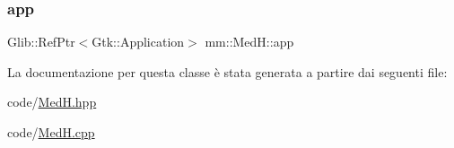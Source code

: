 \subsubsection{\texorpdfstring{app}{app}}
{\footnotesize\ttfamily Glib\+::\+Ref\+Ptr$<$Gtk\+::\+Application$>$ mm\+::\+Med\+H\+::app}



La documentazione per questa classe è stata generata a partire dai seguenti file\+:\begin{DoxyCompactItemize}
\item 
code/\mbox{\hyperlink{_med_h_8hpp}{Med\+H.\+hpp}}\item 
code/\mbox{\hyperlink{_med_h_8cpp}{Med\+H.\+cpp}}\end{DoxyCompactItemize}
